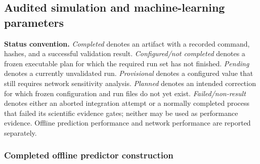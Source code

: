 
\begingroup
\setlength{\tabcolsep}{2pt}
\subsection*{Audited simulation and machine-learning parameters}

\noindent\textbf{Status convention.}
\emph{Completed} denotes an artifact with a recorded command, hashes, and a
successful validation result.  \emph{Configured/not completed} denotes a
frozen executable plan for which the required run set has not finished.
\emph{Pending} denotes a currently unvalidated run.  \emph{Provisional}
denotes a configured value that still requires network sensitivity analysis.
\emph{Planned} denotes an intended correction for which frozen configuration
and run files do not yet exist.
\emph{Failed/non-result} denotes either an aborted integration attempt or a
normally completed process that failed its scientific evidence gates; neither
may be used as performance evidence.  Offline prediction performance and
network performance are reported separately.

\subsubsection*{Completed offline predictor construction}

